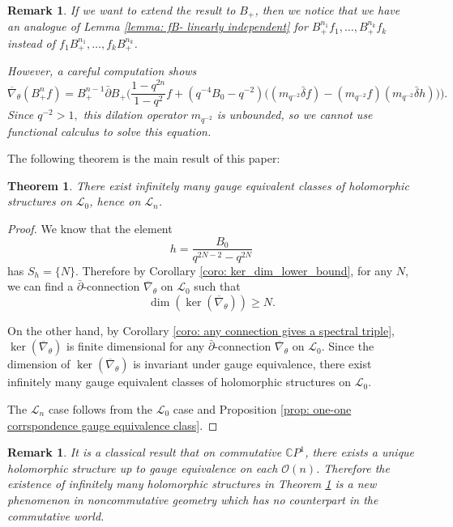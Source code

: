 \documentclass[12pt]{article}
\newtheorem{remark}[definition]{Remark}
\newtheorem{theorem}[definition]{Theorem}
\numberwithin{equation}{section}
\def\pb{\bar{\partial}}
\def\db{\bar{\delta}}
\def\nb{\bar{\nabla}_\theta}
\def\nb{\overline{\nabla}_\theta}
\def\C{{\mathbb C}}
\def\L{\mathcal{L}}
\begin{document}
\begin{remark}
If we want to extend the result to $B_+$, then we notice that we have an analogue of Lemma \ref{lemma: fB- linearly independent} for  $B_+^{n_1}f_1,\ldots, B_+^{n_k}f_k$ instead of $f_1B_+^{n_1},\ldots, f_kB_+^{n_k}$.

However, a careful computation shows
\begin{equation}
      \nb(B_+^n f) = B_+^{n-1}  \pb B_+ \Big( \frac{1-q^{2n}}{1-q^2} f +  (q^{-4} B_0 - q^{-2})
    \big((m_{q^{-2}} \db f) - (m_{q^{-2}} f)(m_{q^{-2}} \db h)\big)  \Big).
\end{equation}
Since $q^{-2} > 1,$ this dilation operator $m_{q^{-2}}$ is unbounded, so we cannot use functional calculus to solve this equation.
\end{remark}

The following theorem is the main result of this paper:


\begin{theorem}\label{thm: infinitely many gauge class}
    There exist infinitely many gauge equivalent classes of holomorphic structures on $\L_0$, hence on $\L_n$.
\end{theorem}
\begin{proof}
    We know  that the element $$
    h=\frac{B_0}{q^{2N-2}-q^{2N}}
    $$ has  $S_h=\{N\}$. Therefore by Corollary \ref{coro: ker_dim_lower_bound}, for any $N$, we can find a $\pb$-connection $\nb$ on $\L_0$ such that 
    $$
    \dim(\ker(\nb)) \geq N.
    $$

On the other hand, by Corollary \ref{coro: any connection gives a spectral triple}, $\ker(\nb)$ is finite dimensional for any  $\pb$-connection $\nb$ on $\L_0$. Since the dimension of $\ker(\nb)$  is invariant under gauge equivalence, there exist infinitely many gauge equivalent classes of holomorphic structures on $\L_0$.

The $\L_n$ case follows from the $\L_0$ case and Proposition \ref{prop: one-one corrspondence gauge equivalence class}.
\end{proof}



\begin{remark}
It is a classical result that on commutative $\C P^1$, there exists a unique holomorphic structure up to gauge equivalence on each $\mathcal{O}(n)$. Therefore the existence of infinitely many holomorphic structures in Theorem \ref{thm: infinitely many gauge class} is a new phenomenon in noncommutative geometry which has no counterpart in the commutative world.
\end{remark}
    
\end{document}
